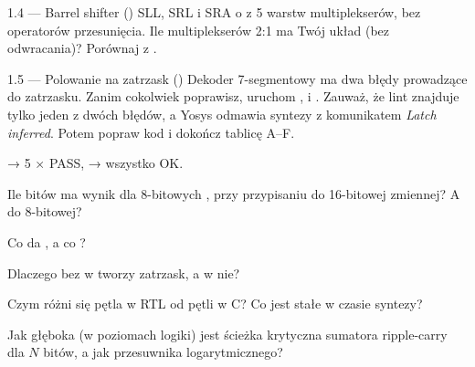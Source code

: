 \begin{zadanie}{1.4 --- Barrel shifter ()}
SLL, SRL i SRA o  z 5 warstw multiplekserów, bez operatorów
przesunięcia. Ile multiplekserów 2:1 ma Twój układ (bez odwracania)? Porównaj z
.
\end{zadanie}

\begin{zadanie}{1.5 --- Polowanie na zatrzask ()}
Dekoder 7-segmentowy ma dwa błędy prowadzące do zatrzasku. Zanim cokolwiek
poprawisz, uruchom ,  i
. Zauważ, że lint znajduje tylko jeden z dwóch
błędów, a Yosys odmawia syntezy z komunikatem \emph{Latch inferred}. Potem
popraw kod i dokończ tablicę A--F.
\end{zadanie}

\begin{gotowe}
 → 5 × PASS,  → wszystko OK.
\end{gotowe}

\begin{kontrolne}
  \item Ile bitów ma wynik  dla 8-bitowych ,  przy przypisaniu do 16-bitowej zmiennej? A do 8-bitowej?
  \item Co da , a co ?
  \item Dlaczego  bez  w  tworzy zatrzask, a w  nie?
  \item Czym różni się pętla  w RTL od pętli w C? Co jest stałe w czasie syntezy?
  \item Jak głęboka (w poziomach logiki) jest ścieżka krytyczna sumatora ripple-carry dla $N$ bitów, a jak przesuwnika logarytmicznego?
\end{kontrolne}
